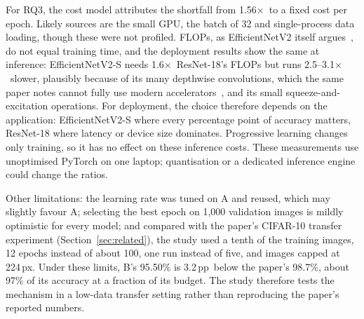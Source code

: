 \documentclass{COMPXXXX}
\newcommand{\pp}{\,pp}
\newcommand{\sx}{$\times$}
\begin{document}
For RQ3, the cost model attributes the shortfall from 1.56\sx\ to a fixed cost per epoch. Likely
sources are the small GPU, the batch of 32 and single-process data loading, though these were not
profiled. FLOPs, as EfficientNetV2 itself argues~\cite{tan2021efficientnetv2}, do not equal training time,
and the deployment results show the same at inference: EfficientNetV2-S needs 1.6\sx\ ResNet-18's
FLOPs but runs 2.5--3.1\sx\ slower, plausibly because of its many depthwise convolutions, which the
same paper notes cannot fully use modern accelerators~\cite{tan2021efficientnetv2}, and its small
squeeze-and-excitation operations. For deployment, the choice therefore depends on the application:
EfficientNetV2-S where every percentage point of accuracy matters, ResNet-18 where latency or device
size dominates. Progressive learning changes only training, so it has no effect on these
inference costs. These measurements use unoptimised PyTorch on one laptop; quantisation or a dedicated
inference engine could change the ratios.

Other limitations: the learning rate was tuned on A and reused, which may slightly favour A; selecting
the best epoch on 1{,}000 validation images is mildly optimistic for every model; and compared with
the paper's CIFAR-10 transfer experiment (Section~\ref{sec:related}), the study used a tenth of the
training images, 12 epochs instead of about 100, one run instead of five, and images capped at
224\,px. Under these limits, B's 95.50\% is 3.2\pp\ below the paper's 98.7\%, about 97\% of its
accuracy at a fraction of its budget. The study therefore tests the
mechanism in a low-data transfer setting rather than reproducing the paper's reported numbers.
\end{document}
